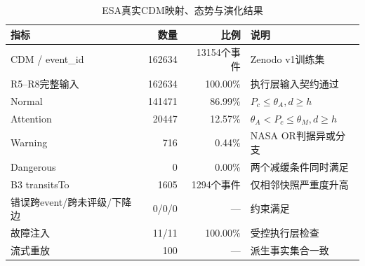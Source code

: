 \begin{table}[t]
\centering
\caption{ESA真实CDM映射、态势与演化结果}
\label{tab:esa-main-results}
\small
\begin{tabular}{lrrl}
\toprule
指标 & 数量 & 比例 & 说明\\
\midrule
CDM / event\_id & 162634 & 13154个事件 & Zenodo v1训练集\\
R5--R8完整输入 & 162634 & 100.00\% & 执行层输入契约通过\\
Normal & 141471 & 86.99\% & $P_c\leq\theta_A, d\geq h$\\
Attention & 20447 & 12.57\% & $\theta_A<P_c\leq\theta_M, d\geq h$\\
Warning & 716 & 0.44\% & NASA OR判据异或分支\\
Dangerous & 0 & 0.00\% & 两个减缓条件同时满足\\
B3 transitsTo & 1605 & 1294个事件 & 仅相邻快照严重度升高\\
错误跨event/跨未评级/下降边 & 0/0/0 & --- & 约束满足\\
故障注入 & 11/11 & 100.00\% & 受控执行层检查\\
流式重放 & 100 & --- & 派生事实集合一致\\
\bottomrule
\end{tabular}
\end{table}
